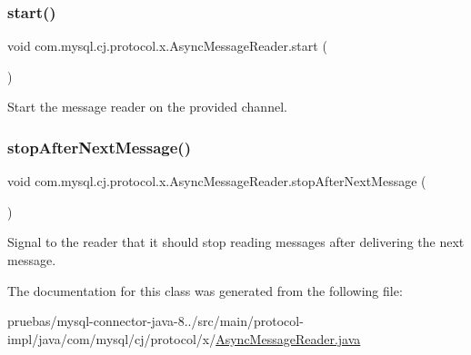 \subsubsection{\texorpdfstring{start()}{start()}}
{\footnotesize\ttfamily void com.\+mysql.\+cj.\+protocol.\+x.\+Async\+Message\+Reader.\+start (\begin{DoxyParamCaption}{ }\end{DoxyParamCaption})}

Start the message reader on the provided channel. \mbox{\label{classcom_1_1mysql_1_1cj_1_1protocol_1_1x_1_1_async_message_reader_a5d7ad4e6d2faa3d5fa7ca04feaf6070f}} 
\subsubsection{\texorpdfstring{stop\+After\+Next\+Message()}{stopAfterNextMessage()}}
{\footnotesize\ttfamily void com.\+mysql.\+cj.\+protocol.\+x.\+Async\+Message\+Reader.\+stop\+After\+Next\+Message (\begin{DoxyParamCaption}{ }\end{DoxyParamCaption})}

Signal to the reader that it should stop reading messages after delivering the next message. 

The documentation for this class was generated from the following file\+:\begin{DoxyCompactItemize}
\item 
pruebas/mysql-\/connector-\/java-\/8../src/main/protocol-\/impl/java/com/mysql/cj/protocol/x/\mbox{\hyperlink{_async_message_reader_8java}{Async\+Message\+Reader.\+java}}\end{DoxyCompactItemize}
